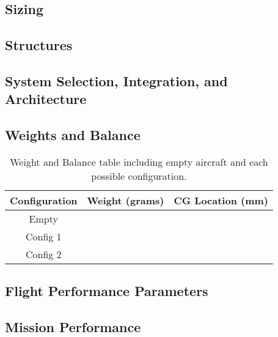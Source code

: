 \documentclass[report]{byu-aero}
\begin{document}
\subsection{Sizing}
\label{ssec:sizing}




\subsection{Structures}
\label{ssec:structures}




\subsection{System Selection, Integration, and Architecture}
\label{ssec:systemdetails}




\subsection{Weights and Balance}
\label{ssec:weightsandbalance}


\begin{table}[h!]
	\centering
	\caption{Weight and Balance table including empty aircraft and each possible configuration.}
	\label{tab:wieghtsandbalance}
	\begin{tabular}{ |c|c|c| } 
		\hline
		\rowcolor{BYUbluemid}
    	Configuration & Weight (grams) & CG Location (mm) \\ 
		\hline
	    Empty &  &  \\ 
		\hline
		Config 1 &  &  \\ 
		\hline
		Config 2 &  &  \\ 
		\hline
	\end{tabular}
\end{table}



\subsection{Flight Performance Parameters}
\label{ssec:flightperformanceparams}




\subsection{Mission Performance}
\label{ssec:missionperformance}
\end{document}
